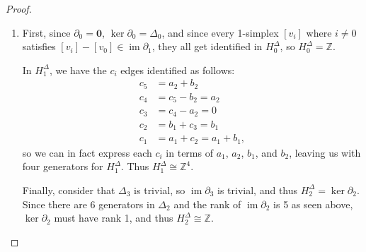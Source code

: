 \documentclass[12pt]{article}
\DeclareMathOperator{\im}{im}
\theoremstyle{definition}
\begin{document}
\begin{proof}
\begin{enumerate}[label=(\roman*)]
\begin{equation*}
\begin{array}{c|c}
				      \sigma \in \Delta_1 & \partial_1(\sigma)                       \\
				      \hline
				      [v_0, v_1]          & [v_1] - [v_0] \\{}
				      [v_0, v_4]          & [v_4] - [v_0] \\{}
				      [v_0, v_3]          & [v_3] - [v_0] \\{}
				      [v_0, v_2]          & [v_2] - [v_0] \\{}
				      [v_0, v_5]          & [v_5] - [v_0] \\{}
				      [v_0, v_7]          & [v_7] - [v_0] \\{}
				      [v_0, v_6]          & [v_6] - [v_0] \\{}
				      [v_1, v_4]          & [v_4] - [v_1] \\{}
				      [v_3, v_4]          & [v_4] - [v_3] \\{}
				      [v_2, v_3]          & [v_3] - [v_2] \\{}
				      [v_2, v_5]          & [v_5] - [v_2] \\{}
				      [v_5, v_7]          & [v_7] - [v_5] \\{}
				      [v_6, v_7]          & [v_7] - [v_6]
			      \end{array}
		      \end{equation*}
		\item First, since $\partial_0 = \mathbf{0}$, $\ker\partial_0 = \Delta_0$, and since every 1-simplex $[v_i]$ where $i \neq 0$ satisfies $[v_i] - [v_0] \in \im\partial_1$, they all get identified in $H_0^\Delta$, so $H_0^\Delta = \mathbb{Z}$.

		      In $H_1^\Delta$, we have the $c_i$ edges identified as follows: \begin{align*}
			      c_5 & = a_2 + b_2              \\
			      c_4 & = c_5 - b_2 = a_2        \\
			      c_3 & = c_4 - a_2 = 0          \\
			      c_2 & = b_1 + c_3 = b_1        \\
			      c_1 & = a_1 + c_2 = a_1 + b_1,
		      \end{align*}
		      so we can in fact express each $c_i$ in terms of $a_1$, $a_2$, $b_1$, and $b_2$, leaving us with four generators for $H_1^\Delta$.
          Thus $H_1^\Delta \cong \mathbb{Z}^4$.

          Finally, consider that $\Delta_3$ is trivial, so $\im\partial_3$ is trivial, and thus $H_2^\Delta = \ker \partial_2$.
          Since there are 6 generators in $\Delta_2$ and the rank of $\im\partial_2$ is 5 as seen above, $\ker\partial_2$ must have rank 1, and thus $H_2^\Delta \cong \mathbb{Z}$.
	\end{enumerate}
\end{proof}
\end{document}

